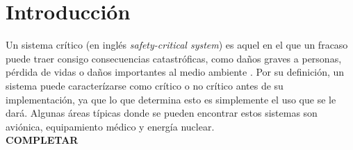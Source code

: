 \section{Introducción}


Un sistema crítico (en inglés \textit{safety-critical system}) es aquel en el que un fracaso puede traer consigo consecuencias catastróficas, como daños graves a personas, pérdida de vidas o daños importantes al medio ambiente \cite[p.~271]{kopetz-2011}. Por su definición, un sistema puede caracterízarse como crítico o no crítico antes de su implementación, ya que lo que determina esto es simplemente el uso que se le dará. Algunas áreas típicas donde se pueden encontrar estos sistemas son aviónica, equipamiento médico y energía nuclear.\\

\textbf{{\color{red} COMPLETAR}}